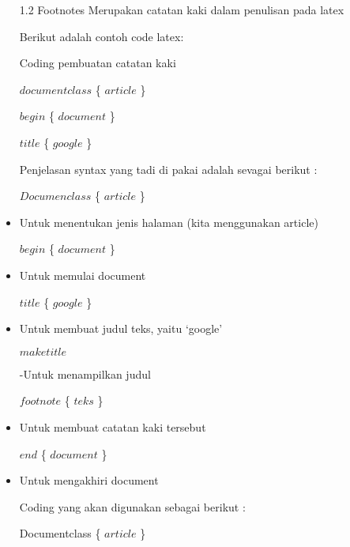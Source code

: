 \begin{itemize}
1.2 Footnotes Merupakan catatan kaki dalam penulisan pada latex \par

Berikut adalah contoh code latex:\par

Coding pembuatan catatan kaki\par

$documentclass$ \{ $article$ \} \par

$begin$ \{ $document$ \} \par

$title$ \{ $google$ \} \par

Penjelasan syntax yang tadi di pakai adalah sevagai berikut :\par

$Documenclass$ \{ $article$ \} \par

	\item Untuk menentukan jenis halaman (kita menggunakan article)\par

$begin$ \{ $document$ \} \par

	\item Untuk memulai document\par

$title$ \{ $google$ \} \par

	\item Untuk membuat judul teks, yaitu ‘google’\par

$maketitle$\par

-Untuk menampilkan judul\par

$footnote$ \{ $teks$ \} \par

	\item Untuk membuat catatan kaki tersebut\par

$end$ \{ $document$ \} \par
	\item Untuk mengakhiri document\par

Coding yang akan digunakan sebagai berikut :\par

Documentclass \{ $article$ \} \par


\end{itemize}
